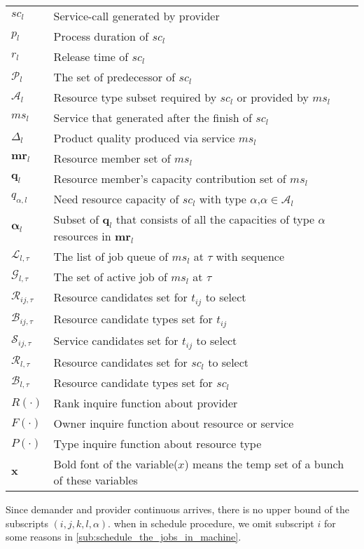 \begin{table}[htbp]
\begin{tabularx}{\textwidth}{|lX|}
	$sc_l$ & Service-call generated by provider\\
	$p_l$ & Process duration of $sc_l$\\
	$r_l$ & Release time of $sc_l$\\
	$\mathcal{P}_{l}$ & The set of predecessor of $sc_{l}$\\
	$\mathcal{A}_l$ & Resource type subset required by $sc_l$ or provided by $ms_l$ \\ %
	$ms_l$ & Service that generated after the finish of $sc_l$\\
	$\Delta_l$ & Product quality produced via service $ms_l$\\
	$\bm{mr}_l$ & Resource member set of $ms_l$\\
	$\bm{q}_l$ & Resource member's capacity contribution set of $ms_l$\\
	$q_{\alpha,l}$ & Need resource capacity of $sc_l$ with type $\alpha$,$\alpha\in\mathcal{A}_{l}$\\
	$\bm{\alpha}_l$ & Subset of $\bm{q}_l$ that consists of all the capacities of type $\alpha$ resources in $\bm{mr}_l$\\
	$\mathcal{L}_{l,\tau}$ & The list of job queue of $ms_l$ at $\tau$ with sequence\\
	$\mathcal{G}_{l,\tau}$ & The set of active job of $ms_l$ at $\tau$ \\
	$\mathcal{R}_{ij,\tau}$ & Resource candidates set for $t_{ij}$ to select\\
	$\mathcal{B}_{ij,\tau}$ & Resource candidate types set for $t_{ij}$\\
	$\mathcal{S}_{ij,\tau}$ & Service candidates set for $t_{ij}$ to select\\
	$\mathcal{R}_{l,\tau}$ & Resource candidates set for $sc_l$ to select\\
	$\mathcal{B}_{l,\tau}$ & Resource candidate types set for $sc_l$\\
	$R(\cdot)$ & Rank inquire function about provider\\
	$F(\cdot)$ & Owner inquire function about resource or service\\
	$P(\cdot)$ & Type inquire function about resource type\\
	$\bm{x}$ & Bold font of the variable($x$) means the temp set of a bunch of these variables\\
    \hline
\end{tabularx}
\end{table}
Since demander and provider continuous arrives, there is no upper bound of the subscripts 
$(i,j,k,l,\alpha)$. when in schedule procedure, we omit subscript $i$ for some reasons in \autoref{sub:schedule_the_jobs_in_machine}.
